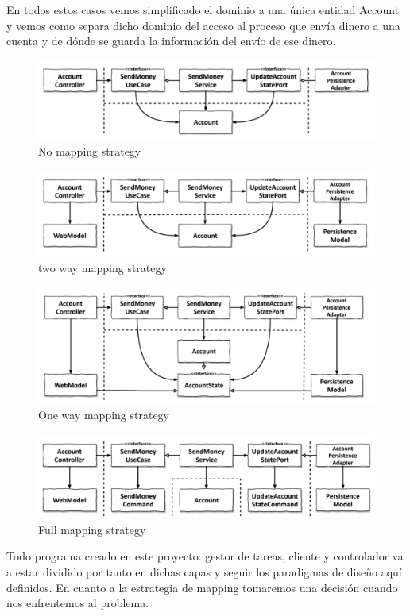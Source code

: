 En todos estos casos vemos simplificado el dominio a una única entidad Account y vemos como separa dicho dominio del acceso al proceso que envía dinero a una cuenta y de dónde se guarda la información del envío de ese dinero.

\begin{figure}[H]
    \centering
    \includegraphics[height=0.1\textheight]{./part/Ejecucion/Seguimiento/CreateTaskUseCase/img/nomapping}
    \caption{No mapping strategy \cite{TomHombergs2019GYHD}}\label{fig:nomapping}
\end{figure}

\begin{figure}[H]
    \centering
    \includegraphics[height=0.1\textheight]{./part/Ejecucion/Seguimiento/CreateTaskUseCase/img/twowaymapping}
    \caption{two way mapping strategy \cite{TomHombergs2019GYHD}}\label{fig:twowaymapping}
\end{figure}

\begin{figure}[H]
    \centering
    \includegraphics[height=0.1\textheight]{./part/Ejecucion/Seguimiento/CreateTaskUseCase/img/onWaymapping}
    \caption{One way mapping strategy \cite{TomHombergs2019GYHD}}\label{fig:onWaymapping}
\end{figure}

\begin{figure}[H]
    \centering
    \includegraphics[height=0.1\textheight]{./part/Ejecucion/Seguimiento/CreateTaskUseCase/img/fullmapping}
    \caption{Full mapping strategy \cite{TomHombergs2019GYHD}}\label{fig:fullmapping}
\end{figure}

Todo programa creado en este proyecto: gestor de tareas, cliente y controlador va a estar dividido por tanto en dichas capas y seguir los paradigmas de diseño aquí definidos. En cuanto a la estrategia de mapping tomaremos una decisión cuando nos enfrentemos al problema.